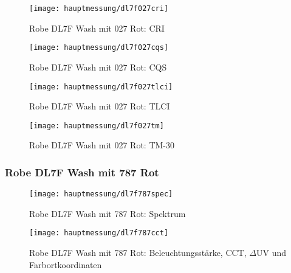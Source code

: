 \documentclass[pagesize,paper=A4,fontsize=12pt,utf8,numbers=noenddot,bibliography=totoc,listof=totoc,DIV=11,BCOR=1mm]{scrreprt}
\begin{document}
\begin{figure}[htp]     %
\centering
\texttt{[image: hauptmessung/dl7f027cri]} 
\caption { Robe DL7F Wash mit 027 Rot: CRI} 
\end{figure}

\begin{figure}[htp]     %
\centering
\texttt{[image: hauptmessung/dl7f027cqs]} 
\caption { Robe DL7F Wash mit 027 Rot: CQS} 
\end{figure}

\begin{figure}[htp]     %
\centering
\texttt{[image: hauptmessung/dl7f027tlci]} 
\caption { Robe DL7F Wash mit 027 Rot: TLCI} 
\end{figure}

\begin{figure}[htp]     %
\centering
\texttt{[image: hauptmessung/dl7f027tm]} 
\caption { Robe DL7F Wash mit 027 Rot: TM-30} 
\end{figure}

\subsubsection{ Robe DL7F Wash mit 787 Rot}

\begin{figure}[htp]     %
\centering
\texttt{[image: hauptmessung/dl7f787spec]} 
\caption { Robe DL7F Wash mit 787 Rot: Spektrum} 
\end{figure}

\begin{figure}[htp]     %
\centering
\texttt{[image: hauptmessung/dl7f787cct]} 
\caption { Robe DL7F Wash mit 787 Rot: Beleuchtungsstärke, CCT, $\Delta$UV und Farbortkoordinaten} 
\end{figure}
\end{document}
